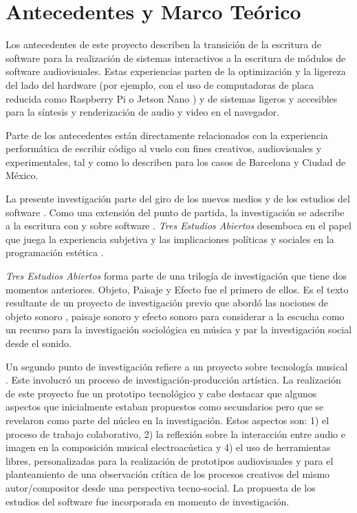 
\section*{Antecedentes y Marco Teórico}


Los antecedentes de este proyecto describen la transición de la escritura de software para la realización de sistemas interactivos a la escritura de módulos de software audiovisuales. Estas experiencias parten de la optimización y la ligereza del lado del hardware (por ejemplo, con el uso de computadoras de placa reducida como Raspberry Pi o Jetson Nano ) y de sistemas ligeros y accesibles para la síntesis y renderización de audio y video en el navegador.

Parte de los antecedentes están directamente relacionados con la experiencia performática de escribir código al vuelo con fines creativos, audiovisuales y experimentales, tal y como lo describen \cite{villasenor} para los casos de Barcelona y Ciudad de México. 

La presente investigación parte del giro de los nuevos medios y de los estudios del software \citep{manovichlanguage}. Como una extensión del punto de partida, la investigación se adscribe a la escritura con y sobre software \citep{aestheticProgramming}. \textit{Tres Estudios Abiertos} desemboca en el papel que juega la experiencia subjetiva y las implicaciones políticas y sociales en la programación estética \citep{speakingCode}. 

\textit{Tres Estudios Abiertos} forma parte de una trilogía de investigación que tiene dos momentos anteriores. Objeto, Paisaje y Efecto \citep{ocelotlLic} fue el primero de ellos. Es el texto resultante de un proyecto de investigación previo que abordó las nociones de objeto sonoro \citep{schaeffer}, paisaje sonoro\citep{schafer1} y efecto sonoro \citep{augoyard} para considerar a la escucha como un recurso para la investigación sociológica en música y par la investigación social desde el sonido. 

Un segundo punto de investigación refiere a un proyecto sobre tecnología musical \citep{ocelotlMas}. Este involucró un proceso de investigación-producción artística. La realización de este proyecto fue un prototipo tecnológico y cabe destacar que algunos aspectos que inicialmente estaban propuestos como secundarios pero que se revelaron como parte del núcleo en la investigación. Estos aspectos son: 1) el proceso de trabajo colaborativo, 2) la reflexión sobre la interacción entre audio e imagen en la composición musical electroacústica y 4) el uso de herramientas libres, personalizadas para la realización de prototipos audiovisuales y para el planteamiento de una observación crítica de los procesos creativos del mismo autor/compositor desde una perspectiva tecno-social. La propuesta de los estudios del software fue incorporada en momento de investigación. 

